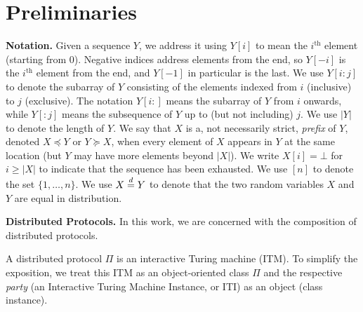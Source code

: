 \section{Preliminaries}

\noindent
\textbf{Notation.}
Given a sequence $Y$, we address it using $Y[i]$ to mean the $i^\text{th}$ element (starting from $0$).
Negative indices address elements from the end, so $Y[-i]$ is the $i^\text{th}$ element from
the end, and $Y[-1]$ in particular is the last. We use $Y[i{:}j]$ to denote the subarray of $Y$
consisting of the elements indexed from $i$ (inclusive) to $j$ (exclusive). The notation $Y[i{:}]$ means the
subarray of $Y$ from $i$ onwards, while $Y[{:}j]$ means the subsequence of $Y$ up to (but not including) $j$.
We use $|Y|$ to denote the length of $Y$.
We say that $X$ is a, not necessarily strict,
\emph{prefix} of $Y$, denoted $X \preceq Y$
or $Y \succeq X$,
when every element of $X$ appears in $Y$ at the
same location (but $Y$ may have more elements beyond $|X|$).
We write $X[i] = \bot$ for $i \geq |X|$ to indicate that the sequence
has been exhausted.
We use $[n]$ to denote the set $\{1, \ldots, n\}$.
We use $X \distreq Y$ to denote that the two random variables $X$ and $Y$
are equal in distribution.

\noindent
\textbf{Distributed Protocols.}
In this work, we are concerned with the composition of distributed
protocols.

A distributed protocol $\Pi$ is an interactive Turing machine (ITM).
To simplify the exposition, we treat this ITM
as an object-oriented class $\Pi$ and the respective \emph{party}
(an Interactive Turing Machine Instance, or ITI) as an object (class instance).

